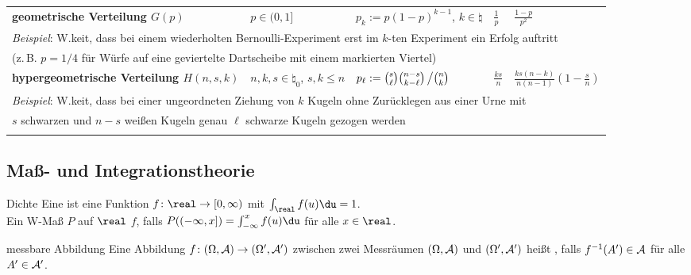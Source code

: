 \begin{landscape}
\begin{tabular}{p{85mm}p{40mm}p{65mm}p{20mm}p{27mm}}
    \addlinespace[5mm]
    \midrule
    \textbf{geometrische Verteilung $G(p)$} &
    $p \in (0, 1]$ &
    $p_k := p (1 - p)^{k-1}$, $k \in \natural$ &
    $\frac{1}{p}$ &
    $\frac{1-p}{p^2}$\\
    \multicolumn{5}{l}{\emph{Beispiel}:
    W.keit, dass bei einem wiederholten Bernoulli-Experiment erst im $k$-ten Experiment ein Erfolg
    auftritt}\\
    \multicolumn{5}{l}{(z.\,B. $p = 1/4$ für Würfe auf eine geviertelte Dartscheibe mit
    einem markierten Viertel)}
    \\

    \addlinespace[5mm]
    \midrule
    \textbf{hypergeometrische Verteilung $H(n, s, k)$} &
    $n, k, s \in \natural_0$, $s, k \le n$ &
    $p_\ell := \binom{s}{\ell} \binom{n-s}{k-\ell} \left/\binom{n}{k}\right.$ &
    $\frac{ks}{n}$ &
    $\frac{ks(n-k)}{n(n-1)}(1-\frac{s}{n})$\\
    \multicolumn{5}{l}{\emph{Beispiel}: W.keit, dass bei einer ungeordneten Ziehung von $k$
    Kugeln ohne Zurücklegen aus einer Urne mit}\\
    \multicolumn{5}{l}{$s$ schwarzen und $n - s$ weißen Kugeln genau
    $\ell$ schwarze Kugeln gezogen werden}\\

    \addlinespace[5mm]
    \bottomrule
\end{tabular}
\end{landscape}

\subsection{%
    Maß- und Integrationstheorie%
}

\begin{Def}{Dichte}
    Eine  ist eine Funktion
    $f\colon \real \rightarrow [0, \infty)$ mit $\int_\real f(u)\du = 1$.\\
    Ein W-Maß $P$ auf $\real$  $f$, falls
    $P((-\infty, x]) = \int_{-\infty}^x f(u)\du$ für alle $x \in \real$.
\end{Def}

\begin{Def}{messbare Abbildung}
    Eine Abbildung $f\colon (\Omega, \mathcal{A}) \rightarrow (\Omega', \mathcal{A}')$ zwischen zwei Messräumen
    $(\Omega, \mathcal{A})$ und $(\Omega', \mathcal{A}')$ heißt , falls
    $f^{-1}(A') \in \mathcal{A}$ für alle $A' \in \mathcal{A}'$.
\end{Def}

